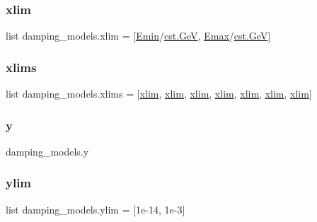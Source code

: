 \subsubsection{\texorpdfstring{xlim}{xlim}}
{\footnotesize\ttfamily list damping\+\_\+models.\+xlim = \mbox{[}\hyperlink{namespacedamping__models_acef10a0ab3ea64edbebc04afc529f201}{Emin}/\hyperlink{constants_8h_aec0e126d9991db8ad0b26139f5860568}{cst.\+GeV}, \hyperlink{namespacedamping__models_a97002a3ccce4531cb0913dad401bb7c8}{Emax}/\hyperlink{constants_8h_aec0e126d9991db8ad0b26139f5860568}{cst.\+GeV}\mbox{]}}

\mbox{\label{namespacedamping__models_abef2252362cdfe34c1df04fa717aa9e0}} 
\subsubsection{\texorpdfstring{xlims}{xlims}}
{\footnotesize\ttfamily list damping\+\_\+models.\+xlims = \mbox{[}\hyperlink{namespacedamping__models_a8e4dbe05634f505a77dc9337dc5ff680}{xlim}, \hyperlink{namespacedamping__models_a8e4dbe05634f505a77dc9337dc5ff680}{xlim}, \hyperlink{namespacedamping__models_a8e4dbe05634f505a77dc9337dc5ff680}{xlim}, \hyperlink{namespacedamping__models_a8e4dbe05634f505a77dc9337dc5ff680}{xlim}, \hyperlink{namespacedamping__models_a8e4dbe05634f505a77dc9337dc5ff680}{xlim}, \hyperlink{namespacedamping__models_a8e4dbe05634f505a77dc9337dc5ff680}{xlim}, \hyperlink{namespacedamping__models_a8e4dbe05634f505a77dc9337dc5ff680}{xlim}\mbox{]}}

\mbox{\label{namespacedamping__models_a1492d9e1b4cd4f3bb6f57f6e7a892e08}} 
\subsubsection{\texorpdfstring{y}{y}}
{\footnotesize\ttfamily damping\+\_\+models.\+y}

\mbox{\label{namespacedamping__models_a3d52fa076d8ee9d19ad108d0746ecc5b}} 
\subsubsection{\texorpdfstring{ylim}{ylim}}
{\footnotesize\ttfamily list damping\+\_\+models.\+ylim = \mbox{[}1e-\/14, 1e-\/3\mbox{]}}

